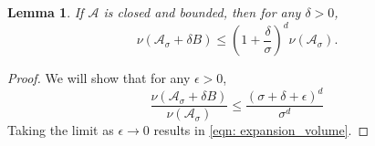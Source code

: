 \documentclass[11pt,twoside]{article}
\newtheorem{lemma}{Lemma}
\newcommand{\1}{\mathbf{1}}
\newcommand{\Aset}{\mathcal{A}}
\newcommand{\Asig}{\Aset_{\sigma}}
\begin{document}
\begin{lemma}
	\label{lem: expansion_volume}
	If $\Aset$ is closed and bounded, then for any $\delta > 0$,
	\begin{equation}
	\label{eqn: expansion_volume}
	\nu(\Asig + \delta B) \leq \left(1 + \frac{\delta}{\sigma}\right)^d \nu(\Asig).
	\end{equation}
\end{lemma}
\begin{proof}
	We will show that for any $\epsilon > 0$, 
	\begin{equation}
	\label{eqn: ratio_of_volume}
	\frac{\nu(\Asig + \delta B)}{\nu(\Asig)} \leq \frac{(\sigma + \delta + \epsilon)^d}{\sigma^d}
	\end{equation}
	Taking the limit as $\epsilon \to 0$ results in \eqref{eqn: expansion_volume}.
	

\end{proof}
\end{document}
